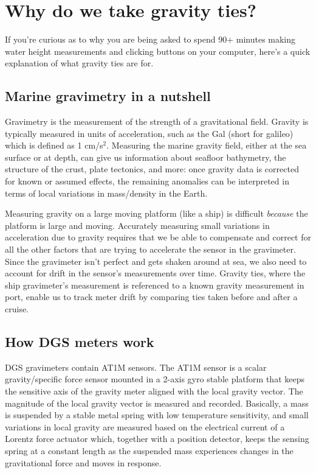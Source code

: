 \documentclass{pfpe-manual}
\begin{document}
\section{Why do we take gravity ties?}
If you're curious as to why you are being asked to spend 90+ minutes making water height measurements and clicking buttons on your computer, here's a quick explanation of what gravity ties are for.

\subsection{Marine gravimetry in a nutshell}
Gravimetry is the measurement of the strength of a gravitational field. Gravity is typically measured in units of acceleration, such as the Gal (short for galileo) which is defined as 1 cm/s$^2$. Measuring the marine gravity field, either at the sea surface or at depth, can give us information about seafloor bathymetry, the structure of the crust, plate tectonics, and more: once gravity data is corrected for known or assumed effects, the remaining anomalies can be interpreted in terms of local variations in mass/density in the Earth.

Measuring gravity on a large moving platform (like a ship) is difficult \emph{because} the platform is large and moving. Accurately measuring small variations in acceleration due to gravity requires that we be able to compensate and correct for all the other factors that are trying to accelerate the sensor in the gravimeter. Since the gravimeter isn't perfect and gets shaken around at sea, we also need to account for drift in the sensor's measurements over time. Gravity ties, where the ship gravimeter's measurement is referenced to a known gravity measurement in port, enable us to track meter drift by comparing ties taken before and after a cruise. 

\subsection{How DGS meters work}
DGS gravimeters contain AT1M sensors. The AT1M sensor is a scalar gravity/specific force sensor mounted in a 2-axis gyro stable platform that keeps the sensitive axis of the gravity meter aligned with the local gravity vector. The magnitude of the local gravity vector is measured and recorded. Basically, a mass is suspended by a stable metal spring with low temperature sensitivity, and small variations in local gravity are measured based on the electrical current of a Lorentz force actuator which, together with a position detector, keeps the sensing spring at a constant length as the suspended mass experiences changes in the gravitational force and moves in response.
\end{document}
